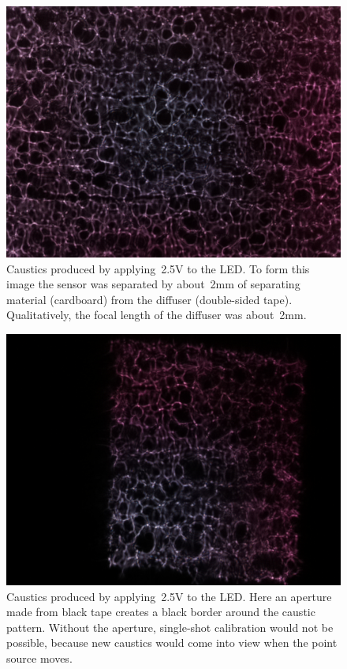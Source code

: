\documentclass[final]{cvpr}
\begin{document}
\begin{figure}[t]
	\centering
	\includegraphics[width=1.0\linewidth]{images/caustic}
	\caption{\label{fig:caustic}
		Caustics produced by applying~\num{2.5}V to the LED\@.
		To form this image the sensor was separated by about~\num{2}mm
		of separating material (cardboard) from the diffuser (double-sided tape).
		Qualitatively, the focal length of the diffuser was about~\num{2}mm.}
\end{figure}


\begin{figure}[t]
	\centering
	\includegraphics[width=1.0\linewidth]{images/caustic-with-aperture}
	\caption{\label{fig:caustic-with-aperture}
		Caustics produced by applying~\num{2.5}V to the LED\@.
		Here an aperture made from black tape creates a black border
		around the caustic pattern.
		Without the aperture, single-shot calibration would not be
		possible, because new caustics would come into view when the
		point source moves.}
\end{figure}
\end{document}
